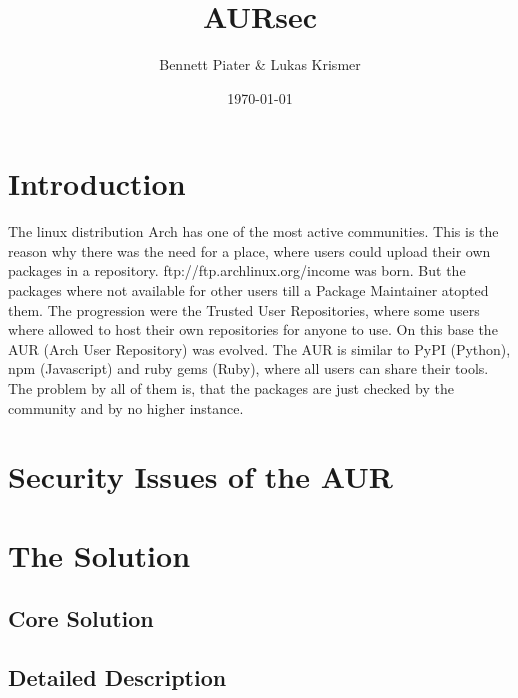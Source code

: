 \documentclass{scrartcl}
\title{AURsec}
\author{Bennett Piater \& Lukas Krismer}
\date{\today}
\begin{document}
  \thispagestyle{empty}

  


  \begin{abstract}
  \end{abstract}

  \tableofcontents
  \listoffigures
  \listoftables
  \pagebreak


  \section{Introduction}  %
  The linux distribution Arch has one of the most active communities. This is the reason why there was the need for a place, where users could upload their own packages in a repository.
  ftp://ftp.archlinux.org/income was born. But the packages where not available for other users till a Package Maintainer atopted them.
  The progression were the Trusted User Repositories, where some users where allowed to host their own repositories for anyone to use. On this base the AUR (Arch User Repository) was evolved. The AUR is similar to PyPI (Python), npm (Javascript) and ruby gems (Ruby), where all users can share their tools. The problem by all of them is, that the packages are just checked by the community and by no higher instance. \cite{wiki:AUR} 

  \section{Security Issues of the AUR} %

  \section{The Solution} %
    \subsection{Core Solution}  %
    \subsection{Detailed Description} %
\end{document}
